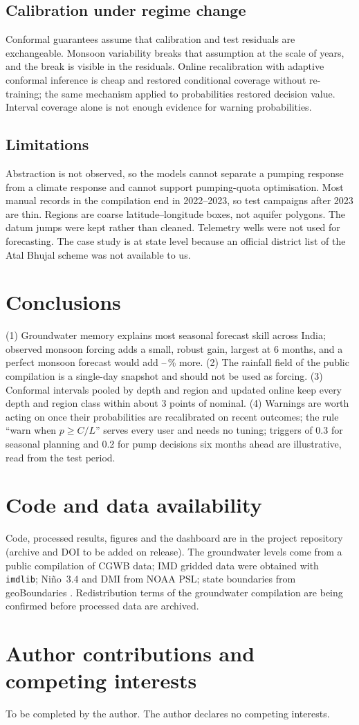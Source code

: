 \documentclass[11pt,a4paper]{article}
\begin{document}
\subsection{Calibration under regime change}
Conformal guarantees assume that calibration and test residuals are exchangeable.
Monsoon variability breaks that assumption at the scale of years, and the break is visible in the residuals. Online
recalibration with adaptive conformal inference is cheap and restored conditional coverage without re-training; the same
mechanism applied to probabilities restored decision value. Interval coverage alone is not enough evidence for warning
probabilities.

\subsection{Limitations}
Abstraction is not observed, so the models cannot separate a pumping response from a climate response
and cannot support pumping-quota optimisation. Most manual records in the compilation end in 2022--2023, so test campaigns after
2023 are thin. Regions are coarse latitude--longitude boxes, not aquifer polygons. The datum jumps were kept rather than cleaned.
Telemetry wells were not used for forecasting. The case study is at state level because an official district list of the Atal
Bhujal scheme was not available to us.

\section{Conclusions}

(1) Groundwater memory explains most seasonal forecast skill across India; observed monsoon forcing adds a small, robust gain,
largest at 6 months, and a perfect monsoon forecast would add \oracleMin--\oracleMax\,\% more. (2) The rainfall field of the
public compilation is a single-day snapshot and should not be used as forcing. (3) Conformal intervals pooled by depth and region
and updated online keep every depth and region class within about 3 points of nominal. (4) Warnings are worth acting on once their
probabilities are recalibrated on recent outcomes; the rule ``warn when $p \ge C/L$'' serves every user and needs no tuning; triggers of 0.3 for
seasonal planning and 0.2 for pump decisions six months ahead are illustrative, read from the test period.

\section*{Code and data availability}
Code, processed results, figures and the dashboard are in the project repository (archive and DOI to be added on release). The
groundwater levels come from a public compilation of CGWB data; IMD gridded data were obtained with \texttt{imdlib}; Ni\~no~3.4
and DMI from NOAA PSL; state boundaries from geoBoundaries \citep{runfola2020geoboundaries}. Redistribution terms of the
groundwater compilation are being confirmed before processed data are archived.

\section*{Author contributions and competing interests}
To be completed by the author. The author declares no competing interests.



\end{document}
